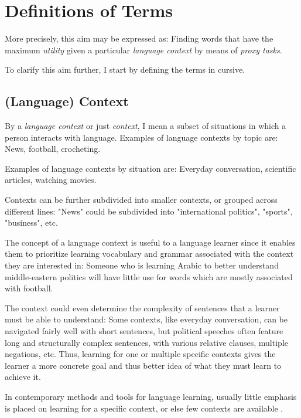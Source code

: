 
\section{Definitions of Terms} \label{seq:definition-of-terms}


More precisely, this aim may be expressed as:
Finding words that have the maximum \textit{utility} given a particular \textit{language context} by means of \textit{proxy tasks}.

To clarify this aim further, I start by defining the terms in cursive.


\subsection{(Language) Context}
By a \textit{language context} or just \textit{context}, I mean a subset of situations in which a person interacts with language.
Examples of language contexts by topic are:
News, football, crocheting.

Examples of language contexts by situation are:
Everyday conversation, scientific articles, watching movies.

Contexts can be further subdivided into smaller contexts, or grouped across different lines:
"News" could be subdivided into "international politics", "sports", "business", etc.

The concept of a language context is useful to a language learner since it enables them to prioritize learning vocabulary and grammar associated with the context they are interested in:
Someone who is learning Arabic to better understand middle-eastern politics will have little use for words which are mostly associated with football.

The context could even determine the complexity of sentences that a learner must be able to understand:
Some contexts, like everyday conversation, can be navigated fairly well with short sentences, but political speeches often feature long and structurally complex sentences, with various relative clauses, multiple negations, etc.
Thus, learning for one or multiple specific contexts gives the learner a more concrete goal and thus better idea of what they must learn to achieve it.

In contemporary methods and tools for language learning, usually little emphasis is placed on learning for a specific context, or else few contexts are available .

